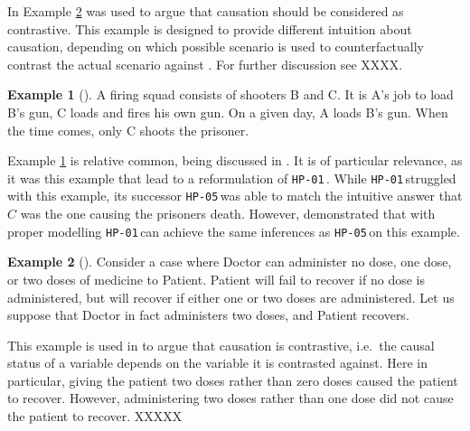\documentclass[11pt,a4paper]{book}
\theoremstyle{definition}
\theoremstyle{definition}
\newtheorem{example}{Example}[section]
\theoremstyle{definition}
\theoremstyle{remark}
\newcommand{\hpo}{\texttt{HP-01}\,}
\newcommand{\hpu}{\texttt{HP-05}\,}
\begin{document}
In \parencite{blanchard2017cause} Example \ref{ex:contrastive-1} was used to argue that causation should be considered as contrastive. 
This example is designed to provide different intuition about causation, depending on which possible scenario is used to counterfactually contrast the actual scenario against \parencite{blanchard2017cause}.
For further discussion see XXXX.


  
 \begin{example}[\cite{weslake2015partial}]
\label{ex:load-1}
A firing squad consists of shooters B and C. It is A’s job to load B’s gun, C loads and fires his own gun. On a given day, A loads B’s gun. When the time comes, only C shoots the prisoner.
 \end{example}
 
Example \ref{ex:load-1} is relative common, being discussed in \parencite{weslake2015partial,chockler2015causal,halpern2016appropriate,bochman2018actual}.
It is of particular relevance, as it was this example that lead to a reformulation of \hpo. While \hpo struggled with this example, its successor \hpu was able to match the intuitive answer that 
$C$ was the one causing the prisoners death.
However, \parencite{halpern2016appropriate} demonstrated that with proper modelling \hpo can achieve the same inferences as \hpu on this example.


 \begin{example}[\cite{blanchard2017cause}]
\label{ex:contrastive-1}
Consider a case where Doctor can administer no dose, one dose, or two doses of medicine to Patient. Patient will fail to recover if no dose is administered, but will recover if either one or two doses are administered. Let us suppose that Doctor in fact administers two doses, and Patient recovers.
 \end{example}
 
This example is used in \parencite{blanchard2017cause} to argue that causation is contrastive, i.e.\ the causal status of a variable depends on the variable it is contrasted against.
Here in particular, giving the patient two doses rather than zero doses caused the patient to recover. However, administering two doses rather than one dose did not cause the patient to recover.
XXXXX
\end{document}
